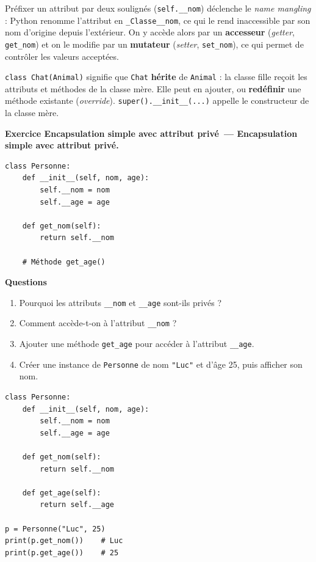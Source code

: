 \documentclass[11pt,a4paper]{article}
\newif\ifcorrige
\newcommand{\py}[1]{\texttt{#1}}
\newcounter{exo}[section]
\renewcommand{\theexo}{\arabic{exo}}
\newcommand{\exo}[2][]{%
  \Needspace{5cm}\stepcounter{exo}%
  \begin{quest}\textbf{Exercice \theexo\ifx\relax#1\relax\else\ — #1\fi.}
  \ifx\relax#2\relax\else\ #2\fi\end{quest}}
\newcommand{\rep}[1]{%
  \ifcorrige
    \par\smallskip{\color{corr}\small#1}\par\smallskip
  \else
    \par\nobreak\vspace{1mm}\noindent\color{black!55}\dotfill\par
    \noindent\color{black!55}\dotfill\par\color{black}\vspace{1mm}
  \fi}
\newcommand{\zonecode}[1][4cm]{%
  \ifcorrige\else
    \par\smallskip\noindent
    \begin{tcolorbox}[colback=white,colframe=black!45,boxrule=0.5pt,arc=1pt,height=#1]\end{tcolorbox}%
  \fi}
\newenvironment{solution}
  {\ifcorrige
     \begin{tcolorbox}[enhanced,breakable,colback=corrbg,colframe=corr,boxrule=0.6pt,arc=1pt,
       left=5pt,right=5pt,top=4pt,bottom=4pt,
       title={Corrigé},coltitle=corr,fonttitle=\bfseries\small,detach title,
       before upper={\tcbtitle\par\smallskip},fontupper=\small]%
   \else
     \setbox0\vbox\bgroup
   \fi}
  {\ifcorrige\end{tcolorbox}\else\egroup\fi}
\begin{document}
\begin{rappel}[Encapsulation]
Préfixer un attribut par deux soulignés (\py{self.__nom}) déclenche le \emph{name mangling} :
Python renomme l'attribut en \py{_Classe__nom}, ce qui le rend inaccessible par son nom
d'origine depuis l'extérieur. On y accède alors par un \textbf{accesseur} (\emph{getter},
\py{get_nom}) et on le modifie par un \textbf{mutateur} (\emph{setter}, \py{set_nom}), ce qui
permet de contrôler les valeurs acceptées.
\end{rappel}

\begin{rappel}[Héritage]
\py{class Chat(Animal)} signifie que \py{Chat} \textbf{hérite} de \py{Animal} : la classe fille
reçoit les attributs et méthodes de la classe mère. Elle peut en ajouter, ou
\textbf{redéfinir} une méthode existante (\emph{override}). \py{super().__init__(...)} appelle le
constructeur de la classe mère.
\end{rappel}

\exo[Encapsulation simple avec attribut privé]{}

\begin{lstlisting}
class Personne:
    def __init__(self, nom, age):
        self.__nom = nom
        self.__age = age

    def get_nom(self):
        return self.__nom

    # Méthode get_age()
\end{lstlisting}

\textbf{Questions}
\begin{enumerate}
  \item Pourquoi les attributs \py{__nom} et \py{__age} sont-ils privés ?
    \rep{Pour empêcher leur modification directe depuis l'extérieur de la classe. L'accès passe
    par des méthodes, ce qui permet de contrôler la lecture et l'écriture et de modifier
    l'implémentation interne sans casser le code qui utilise la classe.}
  \item Comment accède-t-on à l'attribut \py{__nom} ?
    \rep{Par l'accesseur : \py{p.get_nom()}. L'écriture \py{p.__nom} provoque une
    \py{AttributeError}.}
  \item Ajouter une méthode \py{get_age} pour accéder à l'attribut \py{__age}.
  \item Créer une instance de \py{Personne} de nom \py{"Luc"} et d'âge 25, puis afficher son nom.
\end{enumerate}
\zonecode[4.5cm]
\begin{solution}
\begin{lstlisting}
class Personne:
    def __init__(self, nom, age):
        self.__nom = nom
        self.__age = age

    def get_nom(self):
        return self.__nom

    def get_age(self):
        return self.__age

p = Personne("Luc", 25)
print(p.get_nom())    # Luc
print(p.get_age())    # 25
\end{lstlisting}
\end{solution}
\end{document}

